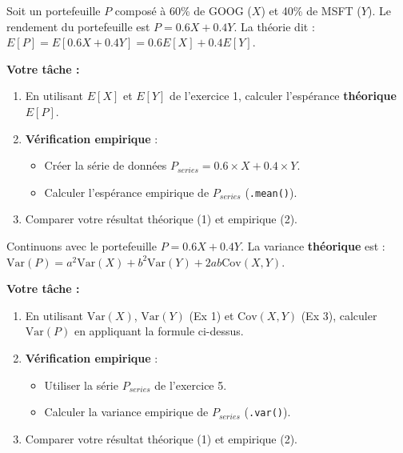 \begin{exercicebox}
Soit un portefeuille $P$ composé à 60\% de GOOG ($X$) et 40\% de MSFT ($Y$).
Le rendement du portefeuille est $P = 0.6X + 0.4Y$.
La théorie dit : $E[P] = E[0.6X + 0.4Y] = 0.6E[X] + 0.4E[Y]$.

\textbf{Votre tâche :}
\begin{enumerate}
    \item En utilisant $E[X]$ et $E[Y]$ de l'exercice 1, calculer l'espérance \textbf{théorique} $E[P]$.
    \item \textbf{Vérification empirique} : 
        \begin{itemize}
            \item Créer la série de données $P_{series} = 0.6 \times X + 0.4 \times Y$.
            \item Calculer l'espérance empirique de $P_{series}$ (\texttt{.mean()}).
        \end{itemize}
    \item Comparer votre résultat théorique (1) et empirique (2).
\end{enumerate}
\end{exercicebox}

\begin{exercicebox}
Continuons avec le portefeuille $P = 0.6X + 0.4Y$.
La variance \textbf{théorique} est : $\text{Var}(P) = a^2\text{Var}(X) + b^2\text{Var}(Y) + 2ab\text{Cov}(X,Y)$.

\textbf{Votre tâche :}
\begin{enumerate}
    \item En utilisant $\text{Var}(X)$, $\text{Var}(Y)$ (Ex 1) et $\text{Cov}(X,Y)$ (Ex 3), calculer $\text{Var}(P)$ en appliquant la formule ci-dessus.
    \item \textbf{Vérification empirique} : 
        \begin{itemize}
            \item Utiliser la série $P_{series}$ de l'exercice 5.
            \item Calculer la variance empirique de $P_{series}$ (\texttt{.var()}).
        \end{itemize}
    \item Comparer votre résultat théorique (1) et empirique (2).
\end{enumerate}
\end{exercicebox}

